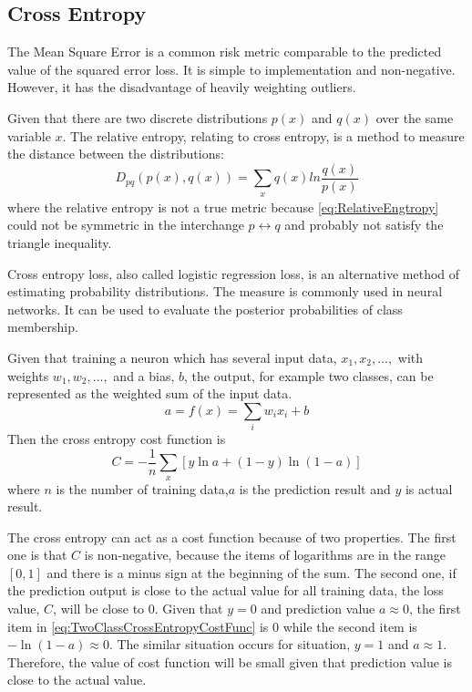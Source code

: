 \subsection{Cross Entropy}

The Mean Square Error is a common risk metric comparable to the predicted value of the squared error loss. It is simple to implementation and non-negative. However, it has the disadvantage of heavily weighting outliers\citep{bermejo2001oriented}.

Given that there are two discrete distributions $p(x)$ and $q(x)$ over the same variable $x$. The relative entropy, relating to cross entropy, is a method to measure the distance between the distributions:
\begin{equation}\label{eq:RelativeEngtropy}
D_{pq}(p(x), q(x)) = \sum_{\substack{x}}q(x)ln\frac{q(x)}{p(x)}
\end{equation}
where the relative entropy is not a true metric because \ref{eq:RelativeEngtropy} could not be symmetric in the interchange $p \leftrightarrow q$ and probably not satisfy the triangle inequality.

Cross entropy loss, also called logistic regression loss, is an alternative method of estimating probability distributions. The measure is commonly used in neural networks. It can be used to evaluate the posterior probabilities of class membership.

Given that training a neuron which has several input data, $x_{1}, x_{2},...,$ with weights $w_{1}, w_{2},...,$ and a bias, $b$, the output, for example two classes, can be represented as the weighted sum of the input data.
\begin{equation}\label{eq:EquationNN}
a = f(x) = \sum_{i}w_{i}x_{i} + b
\end{equation}
Then the cross entropy cost function is
\begin{equation}\label{eq:TwoClassCrossEntropyCostFunc}
C = -\frac{1}{n} \sum_x \left[y \ln a + (1-y ) \ln (1-a) \right]
\end{equation}
where $n$ is the number of training data,$a$ is the prediction result and $y$ is actual result.

The cross entropy can act as a cost function because of two properties. The first one is that $C$ is non-negative, because the items of logarithms are in the range $[0,1]$ and there is a minus sign at the beginning of the sum. The second one, if the prediction output is close to the actual value for all training data, the loss value, $C$, will be close to $0$. Given that $y = 0$ and prediction value $a \approx 0$, the first item in \ref{eq:TwoClassCrossEntropyCostFunc} is $0$ while the second item is $-\ln(1-a) \approx 0$. The similar situation occurs for situation, $y = 1$ and $a \approx 1$. Therefore, the value of cost function will be small given that prediction value is close to the actual value.

